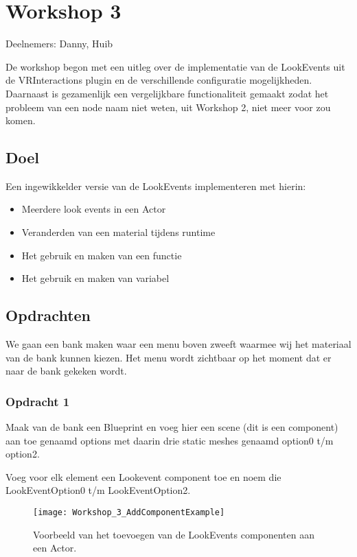 
\chapter{Workshop 3}
\label{appendix:workshop3}
\lhead{}
Deelnemers: Danny, Huib

De workshop begon met een uitleg over de implementatie van de LookEvents uit de VRInteractions plugin en de verschillende configuratie mogelijkheden. Daarnaast is gezamenlijk een vergelijkbare functionaliteit gemaakt zodat het probleem van een node naam niet weten, uit Workshop 2, niet meer voor zou komen.

\section{Doel}
Een ingewikkelder versie van de LookEvents implementeren met hierin:

\begin{itemize}
	\item Meerdere look events in een Actor
	\item Veranderden van een material tijdens runtime
	\item Het gebruik en maken van een functie
	\item Het gebruik en maken van variabel
\end{itemize}

\section{Opdrachten}

We gaan een bank maken waar een menu boven zweeft waarmee wij het materiaal van de bank kunnen kiezen. Het menu wordt zichtbaar op het moment dat er naar de bank gekeken wordt.

\subsection{Opdracht 1}
Maak van de bank een Blueprint en voeg hier een scene (dit is een component) aan toe genaamd options met daarin drie static meshes genaamd option0 t/m option2.

Voeg voor elk element een Lookevent component toe en noem die LookEventOption0 t/m LookEventOption2.

\begin{figure}[!ht]
  \centering
    \texttt{[image: Workshop\_3\_AddComponentExample]}
    \caption{Voorbeeld van het toevoegen van de LookEvents componenten aan een Actor.}
\end{figure}

